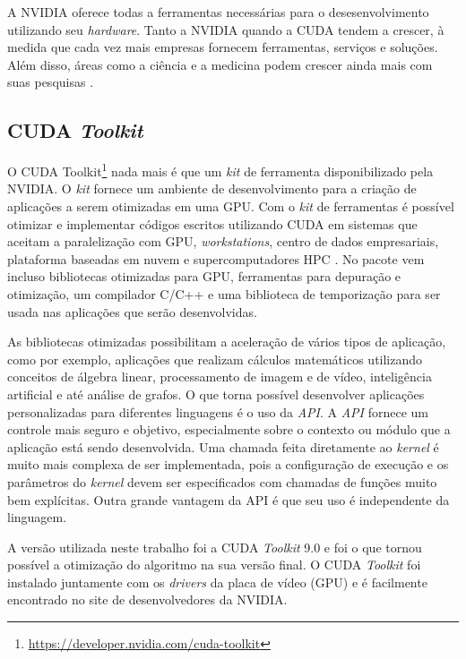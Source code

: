 \documentclass[
	12pt,				%
	twoside,			%
	a4paper,			%
	english,			%
	french,				%
	spanish,			%
	brazil				%
	]{abntex2}
\begin{document}
A NVIDIA oferece todas a ferramentas necessárias para o
desesenvolvimento utilizando seu \emph{hardware}. Tanto a NVIDIA quando
a CUDA tendem a crescer, à medida que cada vez mais empresas fornecem
ferramentas, serviços e soluções. Além disso, áreas como a ciência e a
medicina podem crescer ainda mais com suas pesquisas \cite{CUDA}.

\subsection{\texorpdfstring{CUDA
\emph{Toolkit}}{CUDA Toolkit}}\label{cuda-toolkit}

O CUDA Toolkit\footnote{\url{https://developer.nvidia.com/cuda-toolkit}}
nada mais é que um \emph{kit} de ferramenta disponibilizado pela NVIDIA.
O \emph{kit} fornece um ambiente de desenvolvimento para a criação de
aplicações a serem otimizadas em uma GPU. Com o \emph{kit} de
ferramentas é possível otimizar e implementar códigos escritos
utilizando CUDA em sistemas que aceitam a paralelização com GPU,
\emph{workstations}, centro de dados empresariais, plataforma baseadas
em nuvem e supercomputadores HPC \cite{TOOLKIT}. No pacote vem incluso
bibliotecas otimizadas para GPU, ferramentas para depuração e
otimização, um compilador C/C++ e uma biblioteca de temporização para
ser usada nas aplicações que serão desenvolvidas.

As bibliotecas otimizadas possibilitam a aceleração de vários tipos de
aplicação, como por exemplo, aplicações que realizam cálculos
matemáticos utilizando conceitos de álgebra linear, processamento de
imagem e de vídeo, inteligência artificial e até análise de grafos. O
que torna possível desenvolver aplicações personalizadas para diferentes
linguagens é o uso da \emph{API}. A \emph{API} fornece um controle mais
seguro e objetivo, especialmente sobre o contexto ou módulo que a
aplicação está sendo desenvolvida. Uma chamada feita diretamente ao
\emph{kernel} é muito mais complexa de ser implementada, pois a
configuração de execução e os parâmetros do \emph{kernel} devem ser
especificados com chamadas de funções muito bem explícitas. Outra grande
vantagem da API é que seu uso é independente da linguagem.

A versão utilizada neste trabalho foi a CUDA \emph{Toolkit} 9.0 e foi o
que tornou possível a otimização do algoritmo na sua versão final. O
CUDA \emph{Toolkit} foi instalado juntamente com os \emph{drivers} da
placa de vídeo (GPU) e é facilmente encontrado no site de
desenvolvedores da NVIDIA.
\end{document}
